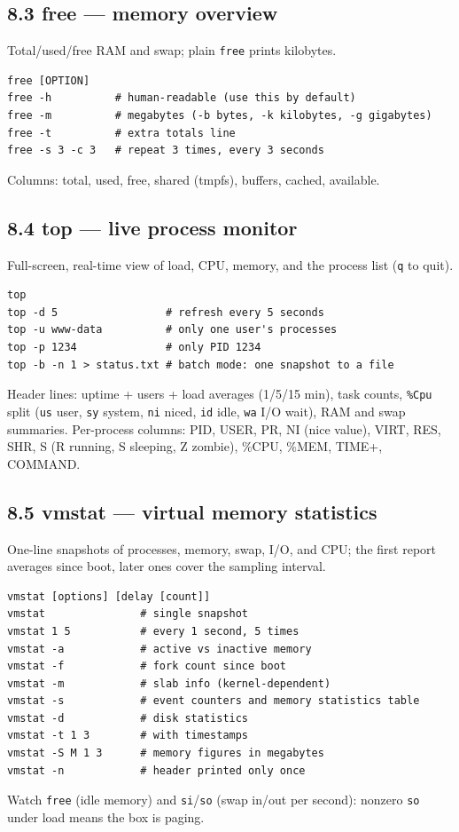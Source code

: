 \documentclass[11pt,a4paper]{article}
\newcommand{\cmd}[1]{\texttt{#1}}
\begin{document}
\subsection{8.3 free --- memory overview}
Total/used/free RAM and swap; plain \cmd{free} prints kilobytes.
\begin{lstlisting}
free [OPTION]
free -h          # human-readable (use this by default)
free -m          # megabytes (-b bytes, -k kilobytes, -g gigabytes)
free -t          # extra totals line
free -s 3 -c 3   # repeat 3 times, every 3 seconds
\end{lstlisting}
Columns: total, used, free, shared (tmpfs), buffers, cached, available.

\subsection{8.4 top --- live process monitor}
Full-screen, real-time view of load, CPU, memory, and the process list (\cmd{q} to quit).
\begin{lstlisting}
top
top -d 5                 # refresh every 5 seconds
top -u www-data          # only one user's processes
top -p 1234              # only PID 1234
top -b -n 1 > status.txt # batch mode: one snapshot to a file
\end{lstlisting}
Header lines: uptime + users + load averages (1/5/15 min), task counts, \cmd{\%Cpu} split (\cmd{us} user, \cmd{sy} system, \cmd{ni} niced, \cmd{id} idle, \cmd{wa} I/O wait), RAM and swap summaries. Per-process columns: PID, USER, PR, NI (nice value), VIRT, RES, SHR, S (R running, S sleeping, Z zombie), \%CPU, \%MEM, TIME+, COMMAND.

\subsection{8.5 vmstat --- virtual memory statistics}
One-line snapshots of processes, memory, swap, I/O, and CPU; the first report averages since boot, later ones cover the sampling interval.
\begin{lstlisting}
vmstat [options] [delay [count]]
vmstat               # single snapshot
vmstat 1 5           # every 1 second, 5 times
vmstat -a            # active vs inactive memory
vmstat -f            # fork count since boot
vmstat -m            # slab info (kernel-dependent)
vmstat -s            # event counters and memory statistics table
vmstat -d            # disk statistics
vmstat -t 1 3        # with timestamps
vmstat -S M 1 3      # memory figures in megabytes
vmstat -n            # header printed only once
\end{lstlisting}
Watch \cmd{free} (idle memory) and \cmd{si}/\cmd{so} (swap in/out per second): nonzero \cmd{so} under load means the box is paging.
\end{document}
